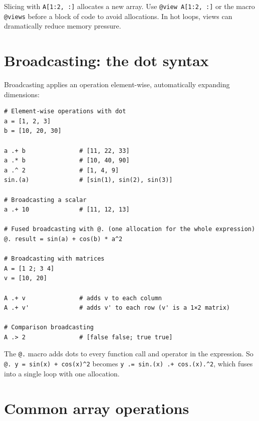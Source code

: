 \begin{performancetip}
Slicing with \texttt{A[1:2, :]} allocates a new array. Use \texttt{@view A[1:2, :]} or the macro \texttt{@views} before a block of code to avoid allocations. In hot loops, views can dramatically reduce memory pressure.
\end{performancetip}

\section{Broadcasting: the dot syntax}

Broadcasting applies an operation element-wise, automatically expanding dimensions:

\begin{verbatim}
# Element-wise operations with dot
a = [1, 2, 3]
b = [10, 20, 30]

a .+ b               # [11, 22, 33]
a .* b               # [10, 40, 90]
a .^ 2               # [1, 4, 9]
sin.(a)              # [sin(1), sin(2), sin(3)]

# Broadcasting a scalar
a .+ 10              # [11, 12, 13]

# Fused broadcasting with @. (one allocation for the whole expression)
@. result = sin(a) + cos(b) * a^2

# Broadcasting with matrices
A = [1 2; 3 4]
v = [10, 20]

A .+ v               # adds v to each column
A .+ v'              # adds v' to each row (v' is a 1×2 matrix)

# Comparison broadcasting
A .> 2               # [false false; true true]
\end{verbatim}

\begin{juliatip}
The \texttt{@.} macro adds dots to every function call and operator in the expression. So \texttt{@. y = sin(x) + cos(x)\^{}2} becomes \texttt{y .= sin.(x) .+ cos.(x).\^{}2}, which fuses into a single loop with one allocation.
\end{juliatip}

\section{Common array operations}

